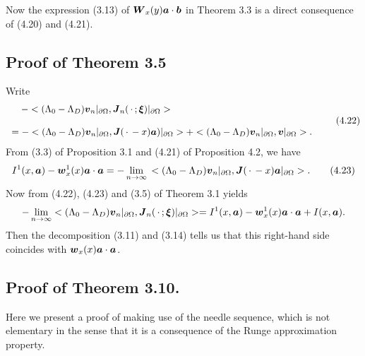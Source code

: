 Now the expression (3.13) of $\mbox{\boldmath $W$}_x(y)\mbox{\boldmath $a$}\cdot\mbox{\boldmath $b$}$
in Theorem 3.3 is a direct consequence of (4.20) and (4.21).










\subsection{Proof of Theorem 3.5}


Write
$$\begin{array}{l}
\displaystyle
\,\,\,\,\,\,
-<(\Lambda_0-\Lambda_D)\mbox{\boldmath $v$}_n\vert_{\partial\Omega},
\mbox{\boldmath $J$}_n(\,\cdot\,;\mbox{\boldmath $\xi$})\vert_{\partial\Omega}>
\\
\\
\displaystyle
=-<(\Lambda_0-\Lambda_D)\mbox{\boldmath $v$}_n\vert_{\partial\Omega},
\mbox{\boldmath $J$}(\,\cdot\,-x)\mbox{\boldmath $a$})\vert_{\partial\Omega}>
+<(\Lambda_0-\Lambda_D)\mbox{\boldmath $v$}_n\vert_{\partial\Omega},
\mbox{\boldmath $v$}\vert_{\partial\Omega}>.
\end{array}
\tag {4.22}
$$
From (3.3) of Proposition 3.1 and (4.21) of  Proposition  4.2, we have
$$\displaystyle
I^1(x,\mbox{\boldmath $a$})-\mbox{\boldmath $w$}_x^1(x)\mbox{\boldmath $a$}\cdot\mbox{\boldmath $a$}
=-\lim_{n\rightarrow\infty}\,<(\Lambda_0-\Lambda_D)\mbox{\boldmath $v$}_n\vert_{\partial\Omega}, \mbox{\boldmath $J$}(\,\cdot\,-x)\mbox{\boldmath $a$}\vert_{\partial\Omega}>.
\tag {4.23}
$$
Now from (4.22), (4.23) and (3.5) of Theorem 3.1 yields
$$\displaystyle
-\lim_{n\rightarrow\infty}<(\Lambda_0-\Lambda_D)\mbox{\boldmath $v$}_n\vert_{\partial\Omega},
\mbox{\boldmath $J$}_n(\,\cdot\,;\mbox{\boldmath $\xi$})\vert_{\partial\Omega}>
=I^1(x,\mbox{\boldmath $a$})-\mbox{\boldmath $w$}_x^1(x)\mbox{\boldmath $a$}\cdot\mbox{\boldmath $a$}
+I(x,\mbox{\boldmath $a$}).
$$
Then the decomposition (3.11) and (3.14) tells us that this right-hand side coincides with $\mbox{\boldmath $w$}_x(x)\mbox{\boldmath $a$}\cdot\mbox{\boldmath $a$}$.




\subsection{Proof of Theorem 3.10.}

Here we present a proof of making use of the needle sequence, which is not elementary in the sense
that it is a consequence of the Runge approximation property.

